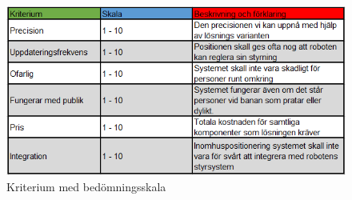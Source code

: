 \documentclass[11pt, a4paper]{report}
\begin{document}
\begin{figure}[H]
	\begin{center}
		\includegraphics [width=12cm,angle=0]{bedomningskala.png}
		\caption{Kriterium med bedömningsskala }
		\label{fig:bedomningskala}
	\end{center}
\end{figure}
\end{document}
